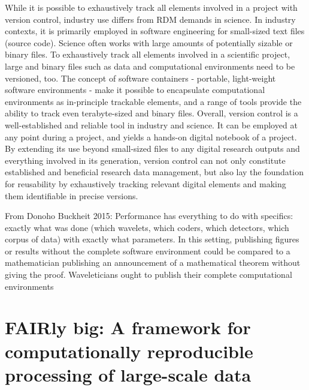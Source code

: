 While it is possible to exhaustively track all elements involved in a project with version control, industry use differs from RDM demands in science.
In industry contexts, it is primarily employed in software engineering for small-sized text files (source code). Science often works with large amounts of potentially sizable or binary files.
To exhaustively track all elements involved in a scientific project, large and binary files such as data and computational environments need to be versioned, too.
The concept of software containers - portable, light-weight software environments - make it possible to encapsulate computational environments as in-principle trackable elements, and a range of tools provide the ability to track even terabyte-sized and binary files.
Overall, version control is a well-established and reliable tool in industry and science. It can be employed at any point during a project, and yields a hands-on digital notebook of a project.
By extending its use beyond small-sized files to any digital research outputs and everything involved in its generation, version control can not only constitute established and beneficial research data management, but also lay the foundation for reusability by exhaustively tracking relevant digital elements and making them identifiable in precise versions.

From Donoho Buckheit 2015: Performance has everything to do with specifics: exactly what was done (which wavelets,
which coders, which detectors, which corpus of data) with exactly what parameters. In
this setting, publishing figures or results without the complete software environment could
be compared to a mathematician publishing an announcement of a mathematical theorem
without giving the proof. Waveleticians ought to publish their complete computational
environments


\pagebreak

\section{FAIRly big: A framework for computationally reproducible processing of large-scale data}


\pagebreak